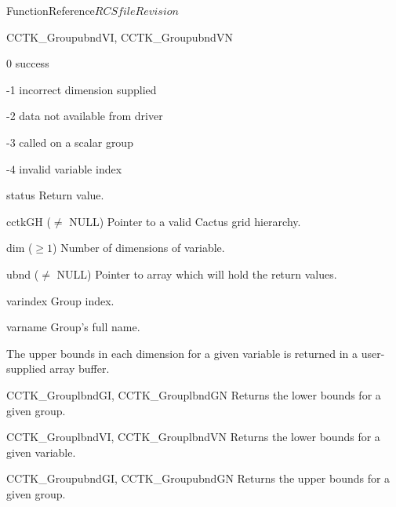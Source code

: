\begin{cactuspart}{FunctionReference}{$RCSfile$}{$Revision$}
\begin{FunctionDescription}{CCTK\_GroupubndVI, CCTK\_GroupubndVN}
\begin{ResultSection}
\begin{Result}{\rm 0} success \end{Result}
\begin{Result}{\rm -1} incorrect dimension supplied \end{Result}
\begin{Result}{\rm -2} data not available from driver \end{Result}
\begin{Result}{\rm -3} called on a scalar group \end{Result}
\begin{Result}{\rm -4} invalid variable index \end{Result}
\end{ResultSection}

\begin{ParameterSection}
\begin{Parameter}{status} Return value. \end{Parameter}
\begin{Parameter}{cctkGH ($\ne$ NULL)} Pointer to a valid Cactus grid hierarchy. \end{Parameter}
\begin{Parameter}{dim ($\ge 1$)} Number of dimensions of variable. \end{Parameter}
\begin{Parameter}{ubnd ($\ne$ NULL)} Pointer to array which will hold the return values. \end{Parameter}
\begin{Parameter}{varindex} Group index. \end{Parameter}
\begin{Parameter}{varname} Group's full name. \end{Parameter}
\end{ParameterSection}

\begin{Discussion}
The upper bounds in each dimension for a given variable is returned in a user-supplied array buffer.
\end{Discussion}

\begin{SeeAlsoSection}
\begin{SeeAlso}{CCTK\_GrouplbndGI, CCTK\_GrouplbndGN}
Returns the lower bounds for a given group.
\end{SeeAlso}
\begin{SeeAlso}{CCTK\_GrouplbndVI, CCTK\_GrouplbndVN}
Returns the lower bounds for a given variable.
\end{SeeAlso}
\begin{SeeAlso}{CCTK\_GroupubndGI, CCTK\_GroupubndGN}
Returns the upper bounds for a given group.
\end{SeeAlso}
\end{SeeAlsoSection}


\end{FunctionDescription}
\end{cactuspart}
